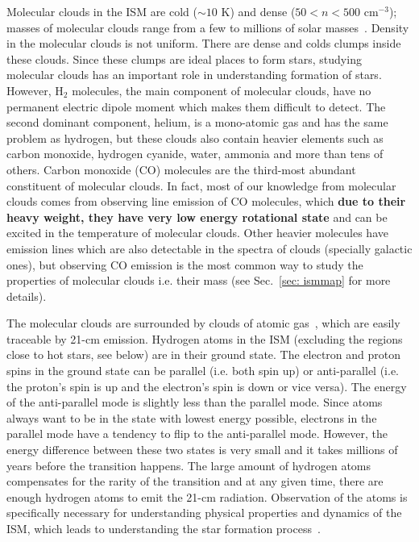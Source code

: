 Molecular clouds in the ISM are cold ($\sim10$ K) and dense ($ 50<n<500$ cm$^{-3}$); masses of molecular clouds range from a few to millions of solar masses~\citep{Bolato08}.
Density in the molecular clouds is not uniform. There are dense and colds clumps inside these clouds.
Since these clumps are ideal places to form stars, studying molecular clouds has an important role in understanding formation of stars.
However, H$_2$ molecules, the main component of molecular clouds, have no permanent electric dipole moment which makes them difficult to detect.
The second dominant component, helium, is a mono-atomic gas and has the same problem as hydrogen, but these clouds also contain heavier elements such as carbon monoxide, hydrogen cyanide, water, ammonia and more than tens of others.
Carbon monoxide (CO) molecules are the third-most abundant constituent of molecular clouds.
In fact, most of our knowledge from molecular clouds comes from observing line emission of CO molecules, which {\bf due to their heavy weight, they have very low energy rotational state} and can be excited in the temperature of molecular clouds.%
Other heavier molecules have emission lines which are also detectable in the spectra of clouds (specially galactic ones), but observing CO emission is the most common way to study the properties of molecular clouds i.e. their mass (see Sec.~\ref{sec: ismmap} for more details).

The molecular clouds are surrounded by clouds of atomic gas~\citep{Kennicutt12}, which are easily traceable by 21-cm emission.
Hydrogen atoms in the ISM (excluding the regions close to hot stars, see below) are in their ground state. 
The electron and proton spins in the ground state can be parallel (i.e. both spin up) or anti-parallel (i.e. the proton's spin is up and the electron's spin is down or vice versa). 
The energy of the anti-parallel mode is slightly less than the parallel mode.
Since atoms always want to be in the state with lowest energy possible, electrons in the parallel mode have a tendency to flip to the anti-parallel mode. 
However, the energy difference between these two states is very small and it takes millions of years before the transition happens.
The large amount of hydrogen atoms compensates for the rarity of the transition and at any given time, there are enough hydrogen atoms to emit the 21-cm radiation. 
Observation of the \hi atoms is specifically necessary for understanding physical properties and dynamics of the ISM, which leads to understanding the star formation process~\citep{Walter08}.

